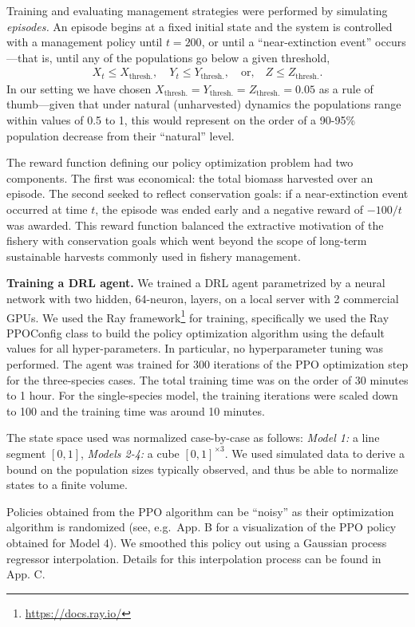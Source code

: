 \documentclass{article}
\begin{document}
Training and evaluating management strategies were performed by
simulating \emph{episodes.} An episode begins at a fixed initial state
and the system is controlled with a management policy until \(t=200\),
or until a ``near-extinction event'' occurs---that is, until any of the
populations go below a given threshold, \begin{align}
  \label{eq:thresh}
  X_t \leq X_{\text{thresh.}},\quad
  Y_t \leq Y_{\text{thresh.}},\quad
  \text{or,}\quad
  Z \leq Z_{\text{thresh.}}.
\end{align} In our setting we have chosen
\(X_{\text{thresh.}}=Y_{\text{thresh.}}=Z_{\text{thresh.}}=0.05\) as a
rule of thumb---given that under natural (unharvested) dynamics the
populations range within values of 0.5 to 1, this would represent on the
order of a 90-95\% population decrease from their ``natural'' level.

The reward function defining our policy optimization problem had two
components. The first was economical: the total biomass harvested over
an episode. The second seeked to reflect conservation goals: if a
near-extinction event occurred at time \(t\), the episode was ended
early and a negative reward of \(-100/t\) was awarded. This reward
function balanced the extractive motivation of the fishery with
conservation goals which went beyond the scope of long-term sustainable
harvests commonly used in fishery management.

\textbf{Training a DRL agent.} We trained a DRL agent parametrized by a
neural network with two hidden, 64-neuron, layers, on a local server
with 2 commercial GPUs. We used the Ray
framework\footnote{\url{https://docs.ray.io/}} for training,
specifically we used the Ray PPOConfig class to build the policy
optimization algorithm using the default values for all
hyper-parameters. In particular, no hyperparameter tuning was performed.
The agent was trained for 300 iterations of the PPO optimization step
for the three-species cases. The total training time was on the order of
30 minutes to 1 hour. For the single-species model, the training
iterations were scaled down to 100 and the training time was around 10
minutes.

The state space used was normalized case-by-case as follows: \emph{Model
1:} a line segment \([0,1]\), \emph{Models 2-4:} a cube
\([0,1]^{\times 3}\). We used simulated data to derive a bound on the
population sizes typically observed, and thus be able to normalize
states to a finite volume.

Policies obtained from the PPO algorithm can be ``noisy'' as their
optimization algorithm is randomized (see, e.g.~App. B for a
visualization of the PPO policy obtained for Model 4). We smoothed this
policy out using a Gaussian process regressor interpolation. Details for
this interpolation process can be found in App. C.
\end{document}

